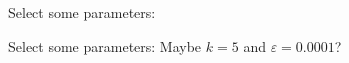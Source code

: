 \documentclass{beamer}
\begin{document}
\begin{frame}
    Select some parameters: 
    \begin{center}
    \end{center}
\end{frame}

\begin{frame}
    Select some parameters: \alert{Maybe $k = 5$ and $\varepsilon = 0.0001$}?
    \begin{center}
    \end{center}
\end{frame}
\end{document}
